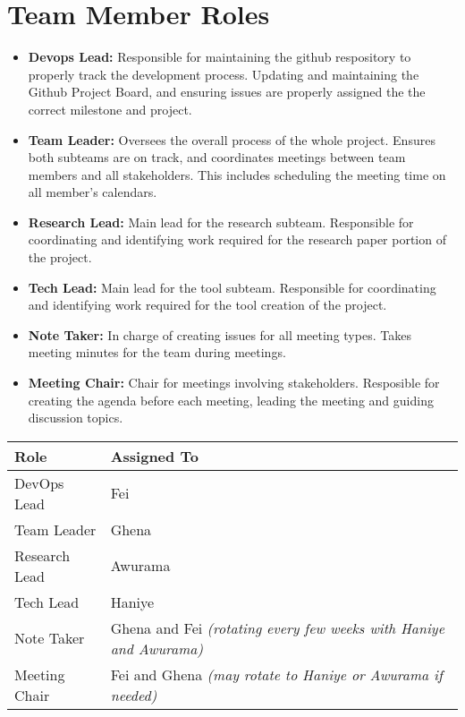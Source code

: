 \documentclass{article}
\begin{document}
\section{Team Member Roles}
\begin{itemize}
  \item \textbf{Devops Lead:} Responsible for maintaining the github respository to properly track the development process. Updating and maintaining the Github Project Board, and ensuring issues are properly assigned the the correct milestone and project.
  \item \textbf{Team Leader:} Oversees the overall process of the whole project. Ensures both subteams are on track, and coordinates meetings between team members and all stakeholders. This includes scheduling the meeting time on all member's calendars.
  \item \textbf{Research Lead:} Main lead for the research subteam. Responsible for coordinating and identifying work required for the research paper portion of the project.
  \item \textbf{Tech Lead:} Main lead for the tool subteam. Responsible for coordinating and identifying work required for the tool creation of the project.
  \item \textbf{Note Taker:} In charge of creating issues for all meeting types. Takes meeting minutes for the team during meetings.
  \item \textbf{Meeting Chair:} Chair for meetings involving stakeholders. Resposible for creating the agenda before each meeting, leading the meeting and guiding discussion topics.
\end{itemize}
\begin{center}
\begin{tabular}{|l|l|}
\hline
\textbf{Role} & \textbf{Assigned To} \\
\hline
DevOps Lead & Fei \\
Team Leader & Ghena \\
Research Lead & Awurama \\
Tech Lead & Haniye \\
Note Taker & Ghena and Fei \textit{(rotating every few weeks with Haniye and Awurama)} \\
Meeting Chair & Fei and Ghena \textit{(may rotate to Haniye or Awurama if needed)} \\
\hline
\end{tabular}
\end{center}
\end{document}
